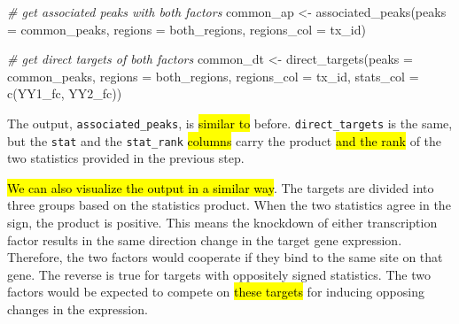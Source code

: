 \documentclass[9pt,a4paper,]{extarticle}
\newenvironment{Shaded}{\begin{snugshade}}{\end{snugshade}}
\newcommand{\AttributeTok}[1]{\textcolor[rgb]{0.77,0.63,0.00}{#1}}
\newcommand{\CommentTok}[1]{\textcolor[rgb]{0.56,0.35,0.01}{\textit{#1}}}
\newcommand{\FunctionTok}[1]{\textcolor[rgb]{0.00,0.00,0.00}{#1}}
\newcommand{\NormalTok}[1]{#1}
\newcommand{\OtherTok}[1]{\textcolor[rgb]{0.56,0.35,0.01}{#1}}
\newcommand{\StringTok}[1]{\textcolor[rgb]{0.31,0.60,0.02}{#1}}
\begin{document}
\begin{Shaded}
\begin{Highlighting}[]
\CommentTok{\# get associated peaks with both factors}
\NormalTok{common\_ap }\OtherTok{\textless{}{-}} \FunctionTok{associated\_peaks}\NormalTok{(}\AttributeTok{peaks =}\NormalTok{ common\_peaks,}
                              \AttributeTok{regions =}\NormalTok{ both\_regions,}
                              \AttributeTok{regions\_col =} \StringTok{\textquotesingle{}tx\_id\textquotesingle{}}\NormalTok{)}

\CommentTok{\# get direct targets of both factors}
\NormalTok{common\_dt }\OtherTok{\textless{}{-}} \FunctionTok{direct\_targets}\NormalTok{(}\AttributeTok{peaks =}\NormalTok{ common\_peaks,}
                            \AttributeTok{regions =}\NormalTok{ both\_regions,}
                            \AttributeTok{regions\_col =} \StringTok{\textquotesingle{}tx\_id\textquotesingle{}}\NormalTok{,}
                            \AttributeTok{stats\_col =} \FunctionTok{c}\NormalTok{(}\StringTok{\textquotesingle{}YY1\_fc\textquotesingle{}}\NormalTok{, }\StringTok{\textquotesingle{}YY2\_fc\textquotesingle{}}\NormalTok{))}
\end{Highlighting}
\end{Shaded}

The output, \texttt{associated\_peaks}, is \hl{similar to} before. \texttt{direct\_targets} is the same, but the \texttt{stat} and the \texttt{stat\_rank} \hl{columns} carry the product \hl{and the rank} of the two statistics provided in the previous step.

\hl{We can also visualize the output in a similar way}. The targets are divided into three groups based on the statistics product. When the two statistics agree in the sign, the product is positive. This means the knockdown of either transcription factor results in the same direction change in the target gene expression. Therefore, the two factors would cooperate if they bind to the same site on that gene. The reverse is true for targets with oppositely signed statistics. The two factors would be expected to compete on \hl{these targets} for inducing opposing changes in the expression.
\end{document}
